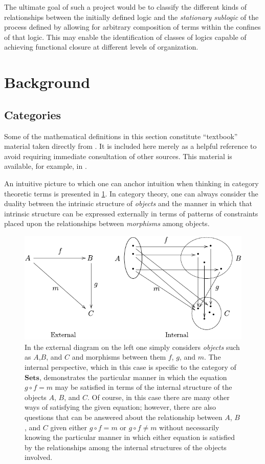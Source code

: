 \documentclass[10pt]{article}
\theoremstyle{plain}
\theoremstyle{definition}
\theoremstyle{remark}
\begin{document}
The ultimate goal of such a project would be to classify the different kinds of relationships between the initially defined logic and the \emph{stationary sublogic} of the process defined by allowing for arbitrary composition of terms within the confines of that logic. This may enable the identification of classes of logics capable of achieving functional closure at different levels of organization.

\section{Background}\label{sec:ctbackground}
\subsection{Categories}
Some of the mathematical definitions in this section constitute ``textbook'' material taken directly from \cite{Planetmath}. It is included here merely as a helpful reference to avoid requiring immediate consultation of other sources. This material is available, for example, in \cite{Lane1998,Lawvere2003,Awodey2006}.

An intuitive picture to which one can anchor intuition when thinking in category theoretic terms is presented in \ref{fig:intextdiag}. In category theory, one can always consider the duality between the intrinsic structure of \emph{objects} and the manner in which that intrinsic structure can be expressed externally in terms of patterns of constraints placed upon the relationships between \emph{morphisms} among objects.

\begin{figure}
\begin{center}
\noindent\includegraphics[width=0.8\columnwidth]{fig/intextdiag.pdf}
\end{center}
\caption[Function composition in an algebraic category]{In the external diagram on the left one simply considers \emph{objects} such as $A$,$B$, and $C$ and morphisms between them $f$, $g$, and $m$. The internal perspective, which in this case is specific to the category of $\mathbf{Sets}$, demonstrates the particular manner in which the equation $g \circ f = m$ may be satisfied in terms of the internal structure of the objects $A$, $B$, and $C$. Of course, in this case there are many other ways of satisfying the given equation; however, there are also questions that can be answered about the relationship between $A$, $B$, and $C$ given either $g \circ f = m$ or $g \circ f \neq m$ without necessarily knowing the particular manner in which either equation is satisfied by the relationships among the internal structures of the objects involved.}
\label{fig:intextdiag}
\end{figure}
\end{document}

